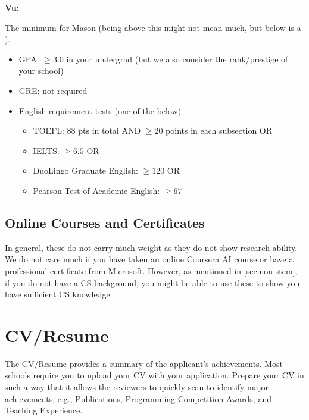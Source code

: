 \documentclass[oneside,11pt,dvipsnames]{book}
\newenvironment{commentbox}[1][]{
  \small
  \begin{mybox}
    {\small \textbf{#1}}
  }{
  \end{mybox}
}
\def\sectioninfo#1{%
  \addcontentsline{toc}{sectioninfo}{%
    \noexpand\numberline{}\color{black}{#1}}%
}
\newcommand{\red}[1]{{\color{red}{#1}}}
\begin{document}
\begin{commentbox}[Vu:]
  The minimum for Mason (being above this might not mean much, but below is a \red{red flag}).
  \begin{itemize}
    \item GPA: $\ge 3.0$ in your undergrad (but we also consider the rank/prestige of your school)
    \item GRE: not required 
    \item English requirement tests (one of the below)
          \begin{itemize}
            \item TOEFL: 88 pts in total AND $\ge 20$ points in each subsection OR
            \item IELTS: $\ge 6.5$ OR
            \item DuoLingo Graduate English: $\ge 120$ OR
            \item Pearson Test of Academic English: $\ge 67$
          \end{itemize}
  \end{itemize}
\end{commentbox}


\subsection{Online Courses and Certificates}
In general, these do not carry much weight as they do not show research ability. We do not care much if you have taken an online Coursera AI course or have a professional certificate from Microsoft.
However, as mentioned in \autoref{sec:non-stem}, if you do not have a CS background, you might be able to use these to show you have sufficient CS knowledge.

\section{CV/Resume}
\sectioninfo{Highlight and summarize major achievements, e.g., Publications, Programming Awards}

The CV/Resume provides a summary of the applicant's achievements. Most schools require you to upload your CV with your application.
Prepare your CV in such a way that it allows the reviewers to quickly scan to identify major achievements, e.g., Publications, Programming Competition Awards, and Teaching Experience.
\end{document}
